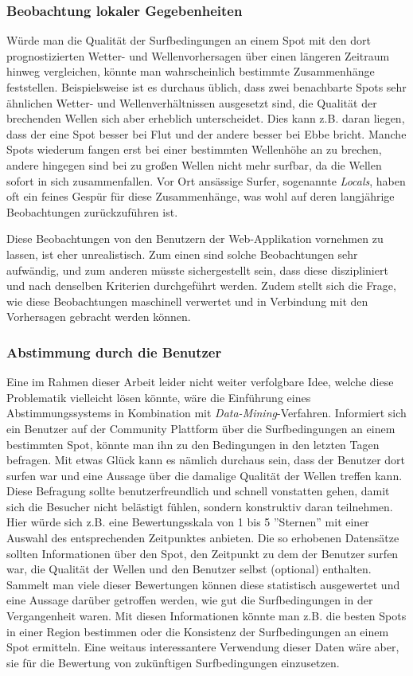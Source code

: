 \subsubsection{Beobachtung lokaler Gegebenheiten}
Würde man die Qualität der Surfbedingungen an einem Spot mit den dort
prognostizierten Wetter- und Wellenvorhersagen über einen längeren
Zeitraum hinweg vergleichen, könnte man wahrscheinlich bestimmte
Zusammenhänge feststellen. Beispielsweise ist es durchaus üblich, dass
zwei benachbarte Spots sehr ähnlichen Wetter- und Wellenverhältnissen
ausgesetzt sind, die Qualität der brechenden Wellen sich aber
erheblich unterscheidet. Dies kann z.B. daran liegen, dass der eine
Spot besser bei Flut und der andere besser bei Ebbe bricht. Manche
Spots wiederum fangen erst bei einer bestimmten Wellenhöhe an zu
brechen, andere hingegen sind bei zu großen Wellen nicht mehr surfbar,
da die Wellen sofort in sich zusammenfallen. Vor Ort ansässige Surfer,
sogenannte \textit{Locals}, haben oft ein feines Gespür für diese
Zusammenhänge, was wohl auf deren langjährige Beobachtungen
zurückzuführen ist.

Diese Beobachtungen von den Benutzern der Web-Applikation vornehmen zu
lassen, ist eher unrealistisch. Zum einen sind solche Beobachtungen
sehr aufwändig, und zum anderen müsste sichergestellt sein, dass diese
diszipliniert und nach denselben Kriterien durchgeführt werden. Zudem
stellt sich die Frage, wie diese Beobachtungen maschinell verwertet
und in Verbindung mit den Vorhersagen gebracht werden können.

\subsubsection{Abstimmung durch die Benutzer}
Eine im Rahmen dieser Arbeit leider nicht weiter verfolgbare Idee,
welche diese Problematik vielleicht lösen könnte, wäre die Einführung
eines Abstimmungssystems in Kombination mit
\textit{Data-Mining}-Verfahren. Informiert sich ein Benutzer auf der
Community Plattform über die Surfbedingungen an einem bestimmten Spot,
könnte man ihn zu den Bedingungen in den letzten Tagen befragen. Mit
etwas Glück kann es nämlich durchaus sein, dass der Benutzer dort
surfen war und eine Aussage über die damalige Qualität der Wellen
treffen kann. Diese Befragung sollte benutzerfreundlich und schnell
vonstatten gehen, damit sich die Besucher nicht belästigt fühlen,
sondern konstruktiv daran teilnehmen. Hier würde sich z.B. eine
Bewertungsskala von 1 bis 5 ''Sternen'' mit einer Auswahl des
entsprechenden Zeitpunktes anbieten. Die so erhobenen Datensätze
sollten Informationen über den Spot, den Zeitpunkt zu dem der Benutzer
surfen war, die Qualität der Wellen und den Benutzer selbst (optional)
enthalten. Sammelt man viele dieser Bewertungen können diese
statistisch ausgewertet und eine Aussage darüber getroffen werden, wie
gut die Surfbedingungen in der Vergangenheit waren. Mit diesen
Informationen könnte man z.B. die besten Spots in einer Region
bestimmen oder die Konsistenz der Surfbedingungen an einem Spot
ermitteln. Eine weitaus interessantere Verwendung dieser Daten wäre
aber, sie für die Bewertung von zukünftigen Surfbedingungen
einzusetzen.

